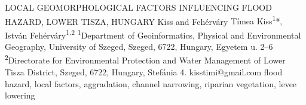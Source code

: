 

\abstract
{LOCAL GEOMORPHOLOGICAL FACTORS INFLUENCING FLOOD HAZARD, LOWER TISZA, HUNGARY} 
{Kiss and Fehérváry} 
{Tímea Kiss\textsuperscript{1}*, István Fehérváry\textsuperscript{1,2}} 
{\KLtag} 
{
	\textsuperscript{1}Department of Geoinformatics, Physical and Environmental Geography, University of Szeged, Szeged, 6722, Hungary, Egyetem u. 2–6
	\textsuperscript{2}Directorate for Environmental Protection and Water Management of Lower Tisza District,
	Szeged, 6722, Hungary, Stefánia 4.
}
{kisstimi@gmail.com}  %
{flood hazard, local factors, aggradation, channel narrowing, riparian vegetation, levee lowering}
